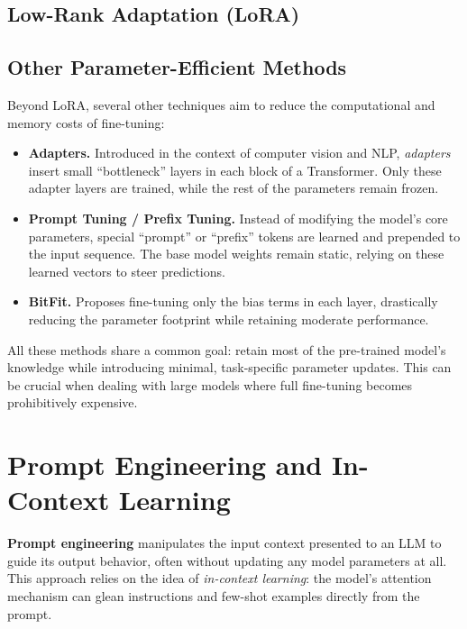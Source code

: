 \subsection{Low-Rank Adaptation (LoRA)}
\label{subsec:lora}


\subsection{Other Parameter-Efficient Methods}
\noindent
Beyond LoRA, several other techniques aim to reduce the computational and memory costs of fine-tuning:
\begin{itemize}
    \item \textbf{Adapters.} Introduced in the context of computer vision and NLP, \emph{adapters} insert small “bottleneck” layers in each block of a Transformer. Only these adapter layers are trained, while the rest of the parameters remain frozen.
    \item \textbf{Prompt Tuning / Prefix Tuning.} Instead of modifying the model’s core parameters, special “prompt” or “prefix” tokens are learned and prepended to the input sequence. The base model weights remain static, relying on these learned vectors to steer predictions.
    \item \textbf{BitFit.} Proposes fine-tuning only the bias terms in each layer, drastically reducing the parameter footprint while retaining moderate performance.
\end{itemize}

\noindent
All these methods share a common goal: retain most of the pre-trained model’s knowledge while introducing minimal, task-specific parameter updates. This can be crucial when dealing with large models where full fine-tuning becomes prohibitively expensive.

\section{Prompt Engineering and In-Context Learning}
\label{sec:prompt_engineering}

\noindent
\textbf{Prompt engineering} manipulates the input context presented to an LLM to guide its output behavior, often without updating any model parameters at all. This approach relies on the idea of \emph{in-context learning}: the model’s attention mechanism can glean instructions and few-shot examples directly from the prompt.

